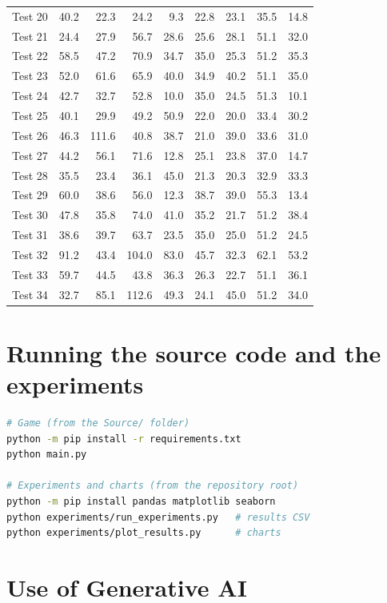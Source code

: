 \begin{longtable}{lrrrrrrrr}
Test 20 & 40.2 & 22.3 & 24.2 & 9.3 & 22.8 & 23.1 & 35.5 & 14.8 \\
Test 21 & 24.4 & 27.9 & 56.7 & 28.6 & 25.6 & 28.1 & 51.1 & 32.0 \\
Test 22 & 58.5 & 47.2 & 70.9 & 34.7 & 35.0 & 25.3 & 51.2 & 35.3 \\
Test 23 & 52.0 & 61.6 & 65.9 & 40.0 & 34.9 & 40.2 & 51.1 & 35.0 \\
Test 24 & 42.7 & 32.7 & 52.8 & 10.0 & 35.0 & 24.5 & 51.3 & 10.1 \\
Test 25 & 40.1 & 29.9 & 49.2 & 50.9 & 22.0 & 20.0 & 33.4 & 30.2 \\
Test 26 & 46.3 & 111.6 & 40.8 & 38.7 & 21.0 & 39.0 & 33.6 & 31.0 \\
Test 27 & 44.2 & 56.1 & 71.6 & 12.8 & 25.1 & 23.8 & 37.0 & 14.7 \\
Test 28 & 35.5 & 23.4 & 36.1 & 45.0 & 21.3 & 20.3 & 32.9 & 33.3 \\
Test 29 & 60.0 & 38.6 & 56.0 & 12.3 & 38.7 & 39.0 & 55.3 & 13.4 \\
Test 30 & 47.8 & 35.8 & 74.0 & 41.0 & 35.2 & 21.7 & 51.2 & 38.4 \\
Test 31 & 38.6 & 39.7 & 63.7 & 23.5 & 35.0 & 25.0 & 51.2 & 24.5 \\
Test 32 & 91.2 & 43.4 & 104.0 & 83.0 & 45.7 & 32.3 & 62.1 & 53.2 \\
Test 33 & 59.7 & 44.5 & 43.8 & 36.3 & 26.3 & 22.7 & 51.1 & 36.1 \\
Test 34 & 32.7 & 85.1 & 112.6 & 49.3 & 24.1 & 45.0 & 51.2 & 34.0 \\
\end{longtable}
\endgroup

\section{Running the source code and the experiments}

\begin{lstlisting}[language=bash, numbers=none]
# Game (from the Source/ folder)
python -m pip install -r requirements.txt
python main.py

# Experiments and charts (from the repository root)
python -m pip install pandas matplotlib seaborn
python experiments/run_experiments.py   # results CSV
python experiments/plot_results.py      # charts
\end{lstlisting}

\section{Use of Generative AI}

